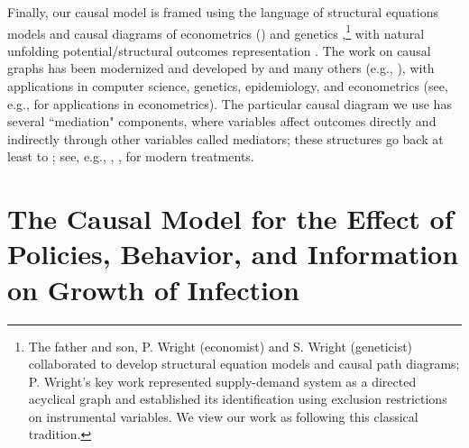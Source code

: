 \documentclass[3p, longtitle]{elsarticle}
\theoremstyle{definition}
\begin{document}
Finally, our causal model is framed using the language of structural equations models and causal diagrams of econometrics (\cite{pwright, haavelmo:1944, tinbergen:1940, wold:1954, pearl:biometrika}) and genetics \citep{wright1923},\footnote{The father and son, P. Wright (economist) and S. Wright (geneticist) collaborated to develop structural equation models and causal path diagrams; P. Wright's key work represented supply-demand system as a directed acyclical graph and established its identification using exclusion restrictions on instrumental variables. We view our work as following this classical tradition.} with natural unfolding potential/structural outcomes representation \citep{rubin1974,tinbergen1930,neyman:PO,imbens_rubin_2015}. The work on causal graphs has been modernized and developed by \cite{pearl:biometrika,pearl:robins,pearl:causality,pearl:why} and many others (e.g., \cite{pearl:why,white:chalak,richardson:mediation,peters2020book,bareinboim:H,hernanrobins2020book}), with applications in computer science, genetics, epidemiology, and econometrics (see, e.g., \cite{heckman:pinto,hunermund,white:chalak} for applications in econometrics). The particular causal diagram we use has several ``mediation" components, where variables affect outcomes directly and indirectly through other variables called mediators; these structures go back at least to \citet[][see Figure 6]{wright1923}; see, e.g., \cite{baron1986}, \cite{Hines2020}, \cite{richardson:mediation} for modern treatments.

\section{The Causal Model for the Effect of Policies, Behavior, and Information on Growth of Infection}\label{sec:causal-model}
\end{document}
